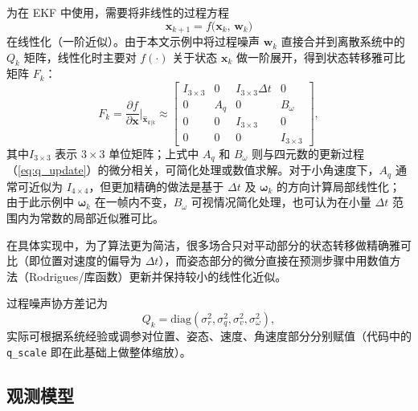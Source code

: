 为在 EKF 中使用，需要将非线性的过程方程
\begin{equation}
	\mathbf{x}_{k+1} = f\bigl(\mathbf{x}_k,\,\mathbf{w}_k\bigr)
\end{equation}
在线性化（一阶近似）。由于本文示例中将过程噪声 \(\mathbf{w}_k\) 直接合并到离散系统中的 \(Q_k\) 矩阵，线性化时主要对 \(f(\cdot)\) 关于状态 \(\mathbf{x}_k\) 做一阶展开，得到状态转移雅可比矩阵 \(F_k\)：
\begin{equation}
	\label{eq:Fk_jac}
	F_k = \frac{\partial f}{\partial \mathbf{x}}\Bigg|_{\hat{\mathbf{x}}_{k|k}}
	\approx
	\begin{bmatrix}
		I_{3\times 3} & 0 & I_{3\times 3}\Delta t & 0 \\
		0 & A_{q}      & 0 & B_{\omega} \\
		0 & 0          & I_{3\times 3} & 0 \\
		0 & 0          & 0 & I_{3\times 3}
	\end{bmatrix},
\end{equation}
其中\(I_{3\times 3}\) 表示 \(3\times 3\) 单位矩阵；上式中 \(A_{q}\) 和 \(B_{\omega}\) 则与四元数的更新过程（\ref{eq:q_update}）的微分相关，可简化处理或数值求解。对于小角速度下，\(A_{q}\) 通常可近似为 \(I_{4\times 4}\)，但更加精确的做法是基于 \(\Delta t\) 及 \(\boldsymbol{\omega}_k\) 的方向计算局部线性化；由于此示例中 \(\boldsymbol{\omega}_k\) 在一帧内不变，\(B_{\omega}\) 可视情况简化处理，也可认为在小量 \(\Delta t\) 范围内为常数的局部近似雅可比。

在具体实现中，为了算法更为简洁，很多场合只对平动部分的状态转移做精确雅可比（即位置对速度的偏导为 \(\Delta t\)），而姿态部分的微分直接在预测步骤中用数值方法（Rodrigues/库函数）更新并保持较小的线性化近似。

过程噪声协方差记为
\begin{equation}
	Q_k = \mathrm{diag}(\sigma_{r}^2, \sigma_{q}^2, \sigma_{v}^2, \sigma_{\omega}^2),
\end{equation}
实际可根据系统经验或调参对位置、姿态、速度、角速度部分分别赋值（代码中的 \texttt{q\_scale} 即在此基础上做整体缩放）。

\subsection{观测模型}

